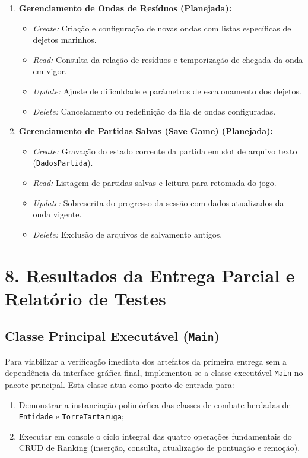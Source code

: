 \documentclass[11pt,a4paper]{article}
\begin{document}
\begin{enumerate}
    \item \textbf{Gerenciamento de Ondas de Resíduos (Planejada):}
    \begin{itemize}
        \item \textit{Create:} Criação e configuração de novas ondas com listas específicas de dejetos marinhos.
        \item \textit{Read:} Consulta da relação de resíduos e temporização de chegada da onda em vigor.
        \item \textit{Update:} Ajuste de dificuldade e parâmetros de escalonamento dos dejetos.
        \item \textit{Delete:} Cancelamento ou redefinição da fila de ondas configuradas.
    \end{itemize}

    \item \textbf{Gerenciamento de Partidas Salvas (Save Game) (Planejada):}
    \begin{itemize}
        \item \textit{Create:} Gravação do estado corrente da partida em slot de arquivo texto (\texttt{DadosPartida}).
        \item \textit{Read:} Listagem de partidas salvas e leitura para retomada do jogo.
        \item \textit{Update:} Sobrescrita do progresso da sessão com dados atualizados da onda vigente.
        \item \textit{Delete:} Exclusão de arquivos de salvamento antigos.
    \end{itemize}
\end{enumerate}

\section*{8. Resultados da Entrega Parcial e Relatório de Testes}
\subsection*{Classe Principal Executável (\texttt{Main})}
Para viabilizar a verificação imediata dos artefatos da primeira entrega sem a dependência da interface gráfica final, implementou-se a classe executável \texttt{Main} no pacote principal. Esta classe atua como ponto de entrada para:
\begin{enumerate}
    \item Demonstrar a instanciação polimórfica das classes de combate herdadas de \texttt{Entidade} e \texttt{TorreTartaruga};
    \item Executar em console o ciclo integral das quatro operações fundamentais do CRUD de Ranking (inserção, consulta, atualização de pontuação e remoção).
\end{enumerate}
\end{document}
